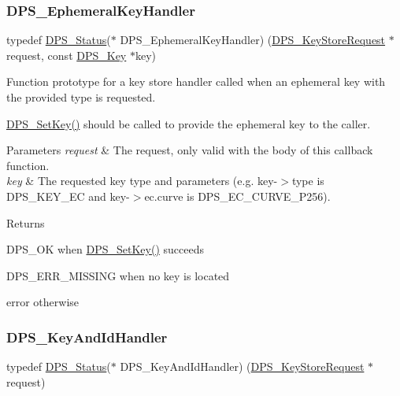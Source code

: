\subsubsection{\texorpdfstring{D\+P\+S\+\_\+\+Ephemeral\+Key\+Handler}{DPS\_EphemeralKeyHandler}}
{\footnotesize\ttfamily typedef \hyperlink{group__status_ga30395a84d3cad9d4ec29848106415038}{D\+P\+S\+\_\+\+Status}($\ast$ D\+P\+S\+\_\+\+Ephemeral\+Key\+Handler) (\hyperlink{group__keystore_ga7c3e50965b65334e9791780fa855ed16}{D\+P\+S\+\_\+\+Key\+Store\+Request} $\ast$request, const \hyperlink{group__keystore_gaa56a1429b6a1658e674eea558bdbbfc0}{D\+P\+S\+\_\+\+Key} $\ast$key)}



Function prototype for a key store handler called when an ephemeral key with the provided type is requested. 

\hyperlink{group__keystore_ga15d6a9b8256b67c2ec8b1d365a98dbab}{D\+P\+S\+\_\+\+Set\+Key()} should be called to provide the ephemeral key to the caller.


\begin{DoxyParams}{Parameters}
{\em request} & The request, only valid with the body of this callback function. \\
\hline
{\em key} & The requested key type and parameters (e.\+g. key-\/$>$type is D\+P\+S\+\_\+\+K\+E\+Y\+\_\+\+EC and key-\/$>$ec.\+curve is D\+P\+S\+\_\+\+E\+C\+\_\+\+C\+U\+R\+V\+E\+\_\+\+P256).\\
\hline
\end{DoxyParams}
\begin{DoxyReturn}{Returns}

\begin{DoxyItemize}
\item D\+P\+S\+\_\+\+OK when \hyperlink{group__keystore_ga15d6a9b8256b67c2ec8b1d365a98dbab}{D\+P\+S\+\_\+\+Set\+Key()} succeeds
\item D\+P\+S\+\_\+\+E\+R\+R\+\_\+\+M\+I\+S\+S\+I\+NG when no key is located
\item error otherwise 
\end{DoxyItemize}
\end{DoxyReturn}
\mbox{\label{group__keystore_ga83d3ade4f4acd7d4385d606270ddfd29}} 
\subsubsection{\texorpdfstring{D\+P\+S\+\_\+\+Key\+And\+Id\+Handler}{DPS\_KeyAndIdHandler}}
{\footnotesize\ttfamily typedef \hyperlink{group__status_ga30395a84d3cad9d4ec29848106415038}{D\+P\+S\+\_\+\+Status}($\ast$ D\+P\+S\+\_\+\+Key\+And\+Id\+Handler) (\hyperlink{group__keystore_ga7c3e50965b65334e9791780fa855ed16}{D\+P\+S\+\_\+\+Key\+Store\+Request} $\ast$request)}



